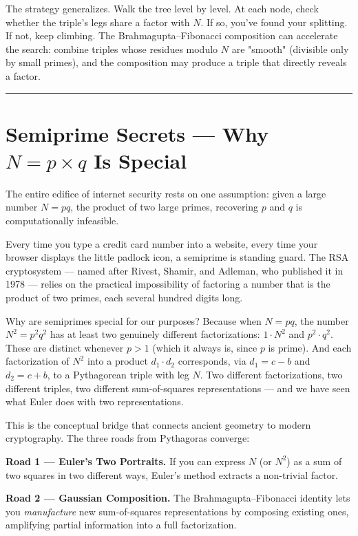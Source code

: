 \documentclass[12pt, letterpaper, openany]{book}
\theoremstyle{definition}
\theoremstyle{remark}
\begin{document}
The strategy generalizes. Walk the tree level by level. At each node, check whether the triple's legs share a factor with $N$. If so, you've found your splitting. If not, keep climbing. The Brahmagupta--Fibonacci composition can accelerate the search: combine triples whose residues modulo $N$ are "smooth" (divisible only by small primes), and the composition may produce a triple that directly reveals a factor.


\bigskip\noindent\rule{\textwidth}{0.4pt}\bigskip



\section*{Semiprime Secrets --- Why $N = p \times q$ Is Special}


The entire edifice of internet security rests on one assumption: given a large number $N = pq$, the product of two large primes, recovering $p$ and $q$ is computationally infeasible.

Every time you type a credit card number into a website, every time your browser displays the little padlock icon, a semiprime is standing guard. The RSA cryptosystem --- named after Rivest, Shamir, and Adleman, who published it in 1978 --- relies on the practical impossibility of factoring a number that is the product of two primes, each several hundred digits long.

Why are semiprimes special for our purposes? Because when $N = pq$, the number $N^2 = p^2 q^2$ has at least two genuinely different factorizations: $1 \cdot N^2$ and $p^2 \cdot q^2$. These are distinct whenever $p > 1$ (which it always is, since $p$ is prime). And each factorization of $N^2$ into a product $d_1 \cdot d_2$ corresponds, via $d_1 = c - b$ and $d_2 = c + b$, to a Pythagorean triple with leg $N$. Two different factorizations, two different triples, two different sum-of-squares representations --- and we have seen what Euler does with two representations.

This is the conceptual bridge that connects ancient geometry to modern cryptography. The three roads from Pythagoras converge:

\textbf{Road 1 --- Euler's Two Portraits.} If you can express $N$ (or $N^2$) as a sum of two squares in two different ways, Euler's method extracts a non-trivial factor.

\textbf{Road 2 --- Gaussian Composition.} The Brahmagupta--Fibonacci identity lets you \textit{manufacture} new sum-of-squares representations by composing existing ones, amplifying partial information into a full factorization.
\end{document}
